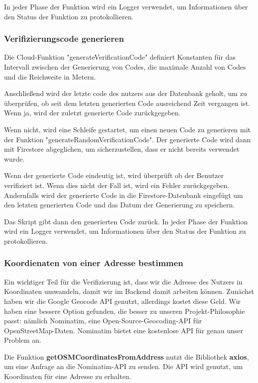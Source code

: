 In jeder Phase der Funktion wird ein Logger verwendet, um Informationen über den Status der Funktion zu protokollieren.

\subsubsection{Verifizierungscode generieren}
Die Cloud-Funktion "generateVerificationCode" definiert Konstanten
für das Intervall zwischen der Generierung von Codes, die
maximale Anzahl von Codes und die Reichweite in Metern.

Anschließend wird der letzte code des nutzers aus der
Datenbank geholt, um zu überprüfen, ob seit dem
letzten generierten Code ausreichend Zeit vergangen ist.
Wenn ja, wird der zuletzt generierte Code zurückgegeben.

Wenn nicht, wird eine Schleife gestartet, um einen neuen
Code zu generieren mit der Funktion "generateRandomVerificationCode". Der generierte Code wird dann mit
Firestore abgeglichen, um sicherzustellen, dass er nicht
bereits verwendet wurde.

Wenn der generierte Code eindeutig ist, wird überprüft ob
der Benutzer verifiziert ist. Wenn dies nicht der Fall ist,
wird ein Fehler zurückgegeben. Andernfalls wird der
generierte Code in die
Firestore-Datenbank eingefügt um den letzten generierten
Code und das Datum der Generierung zu speichern.

Das Skript gibt dann den generierten Code zurück. In jeder
Phase der Funktion wird ein Logger verwendet, um
Informationen über den Status der Funktion zu
protokollieren.

\subsubsection{Koordienaten von einer Adresse bestimmen}
Ein wichtiger Teil für die Verifizierung ist, dass wir die Adresse des Nutzers in Koordinaten umwandeln, damit wir im Backend damit arbeiten können. Zunächst haben wir die Google Geocode API genutzt, allerdings kostet diese Geld. Wir haben eine bessere Option gefunden, die besser zu unseren Projekt-Philosophie passt: nämlich Nominatim, eine Open-Source-Geocoding-API für OpenStreetMap-Daten. Nominatim bietet eine kostenlose API für genau unser Problem an.

Die Funktion \textbf{getOSMCoordinatesFromAddress} nutzt die Bibliothek \textbf{axios}, um eine Anfrage an die Nominatim-API zu senden. Die API wird genutzt, um Koordinaten für eine Adresse zu erhalten.

